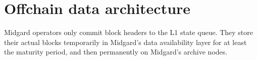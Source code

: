 \documentclass[../midgard.tex]{subfiles}
\begin{document}
\chapter{Offchain data architecture}
\label{h:offchain-data-architecture}

Midgard operators only commit block headers to the L1 state queue.
They store their actual blocks temporarily in Midgard's data availability layer for at least the maturity period, and then permanently on Midgard's archive nodes.
\end{document}

